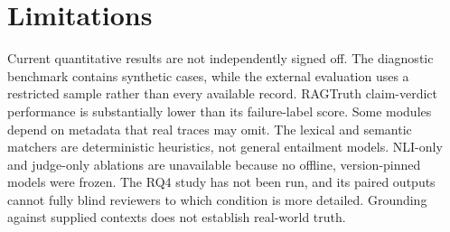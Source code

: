 \section{Limitations}
Current quantitative results are not independently signed off. The diagnostic
benchmark contains synthetic cases, while the external evaluation uses a
restricted sample rather than every available record. RAGTruth claim-verdict
performance is substantially lower than its failure-label score. Some modules
depend on metadata that real traces may omit. The lexical and semantic matchers
are deterministic heuristics, not general entailment models. NLI-only and
judge-only ablations are unavailable because no offline, version-pinned models
were frozen. The RQ4 study has not been run, and its paired outputs cannot fully
blind reviewers to which condition is more detailed. Grounding against supplied
contexts does not establish real-world truth.
